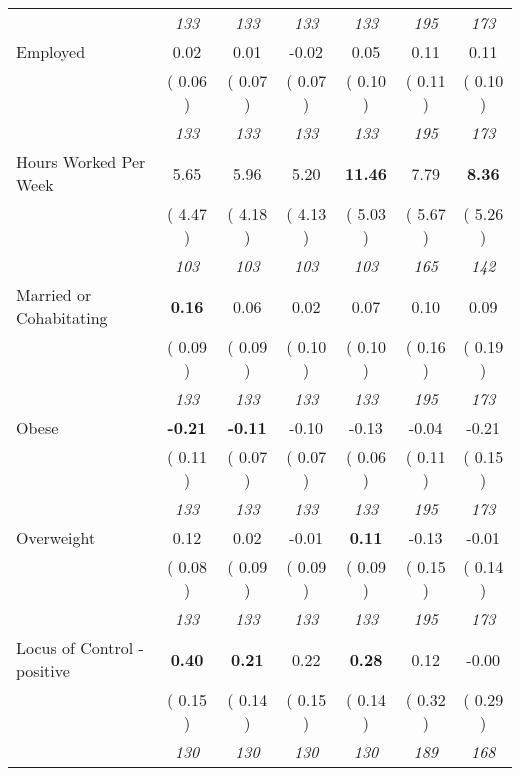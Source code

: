 \begin{tabular}{l c c c c c c}
& \textit{ 133 } & \textit{ 133 } & \textit{ 133 } & \textit{ 133 } & \textit{ 195 } & \textit{ 173 } \\
Employed &      0.02 &      0.01 &     -0.02 &      0.05 &      0.11 &      0.11 \\
& (     0.06 ) & (     0.07 ) & (     0.07 ) & (     0.10 ) & (     0.11 ) & (     0.10 ) \\
& \textit{ 133 } & \textit{ 133 } & \textit{ 133 } & \textit{ 133 } & \textit{ 195 } & \textit{ 173 } \\
Hours Worked Per Week &      5.65 &      5.96 &      5.20 & \textbf{    11.46} &      7.79 & \textbf{      8.36 } \\
& (     4.47 ) & (     4.18 ) & (     4.13 ) & (     5.03 ) & (     5.67 ) & (     5.26 ) \\
& \textit{ 103 } & \textit{ 103 } & \textit{ 103 } & \textit{ 103 } & \textit{ 165 } & \textit{ 142 } \\
Married or Cohabitating & \textbf{      0.16 } &      0.06 &      0.02 &      0.07 &      0.10 &      0.09 \\
& (     0.09 ) & (     0.09 ) & (     0.10 ) & (     0.10 ) & (     0.16 ) & (     0.19 ) \\
& \textit{ 133 } & \textit{ 133 } & \textit{ 133 } & \textit{ 133 } & \textit{ 195 } & \textit{ 173 } \\
Obese & \textbf{     -0.21 } & \textbf{     -0.11 } &     -0.10 &     -0.13 &     -0.04 &     -0.21 \\
& (     0.11 ) & (     0.07 ) & (     0.07 ) & (     0.06 ) & (     0.11 ) & (     0.15 ) \\
& \textit{ 133 } & \textit{ 133 } & \textit{ 133 } & \textit{ 133 } & \textit{ 195 } & \textit{ 173 } \\
Overweight &      0.12 &      0.02 &     -0.01 & \textbf{     0.11} &     -0.13 &     -0.01 \\
& (     0.08 ) & (     0.09 ) & (     0.09 ) & (     0.09 ) & (     0.15 ) & (     0.14 ) \\
& \textit{ 133 } & \textit{ 133 } & \textit{ 133 } & \textit{ 133 } & \textit{ 195 } & \textit{ 173 } \\
Locus of Control - positive & \textbf{      0.40 } & \textbf{      0.21 } &      0.22 & \textbf{     0.28} &      0.12 &     -0.00 \\
& (     0.15 ) & (     0.14 ) & (     0.15 ) & (     0.14 ) & (     0.32 ) & (     0.29 ) \\
& \textit{ 130 } & \textit{ 130 } & \textit{ 130 } & \textit{ 130 } & \textit{ 189 } & \textit{ 168 } \\

\end{tabular}
